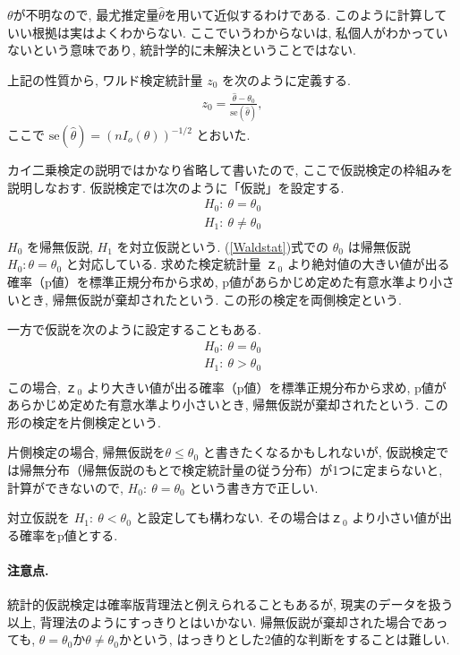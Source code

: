 \documentclass[a4paper, 12pt]{jarticle}
\begin{document}
$\theta$が不明なので, 最尤推定量$\hat \theta$を用いて近似するわけである. このように計算していい根拠は実はよくわからない. ここでいうわからないは, 私個人がわかっていないという意味であり, 統計学的に未解決ということではない. 
 
上記の性質から, ワルド検定統計量 $z_0$ を次のように定義する. 
\begin{align}
z_0=\frac{\hat \theta-\theta_0}{\mathrm{se}(\hat \theta)},
\label{Waldstat}
\end{align}
ここで $\mathrm{se}(\hat \theta) = (nI_o(\theta))^{-1/2}$ とおいた. 

カイ二乗検定の説明ではかなり省略して書いたので, ここで仮説検定の枠組みを説明しなおす.
仮説検定では次のように「仮説」を設定する. 
\begin{align}
H_0:~\theta = \theta_0\\
H_1:~\theta \neq \theta_0\\
 \end{align}
 $H_0$ を帰無仮説, $H_1$ を対立仮説という.
(\ref{Waldstat})式での $\theta_0$ は帰無仮説 $H_0: \theta = \theta_0$ と対応している.
求めた検定統計量 $ｚ_0$ より絶対値の大きい値が出る確率（p値）を標準正規分布から求め, p値があらかじめ定めた有意水準より小さいとき, 帰無仮説が棄却されたという.
この形の検定を両側検定という. 

一方で仮説を次のように設定することもある. 
\begin{align}
H_0:~\theta = \theta_0\\
H_1:~\theta > \theta_0\\
 \end{align}
 この場合, $ｚ_0$ より大きい値が出る確率（p値）を標準正規分布から求め, p値があらかじめ定めた有意水準より小さいとき, 帰無仮説が棄却されたという.
この形の検定を片側検定という. 

片側検定の場合, 帰無仮説を$\theta \le \theta_0$ と書きたくなるかもしれないが, 仮説検定では帰無分布（帰無仮説のもとで検定統計量の従う分布）が1つに定まらないと, 計算ができないので, $H_0:~\theta = \theta_0$ という書き方で正しい.

対立仮説を $H_1:~\theta < \theta_0$ と設定しても構わない. その場合は$ｚ_0$ より小さい値が出る確率をp値とする.

\paragraph{注意点.} 
統計的仮説検定は確率版背理法と例えられることもあるが, 現実のデータを扱う以上, 背理法のようにすっきりとはいかない. 
帰無仮説が棄却された場合であっても, $\theta = \theta_0$か$\theta \neq \theta_0$かという, はっきりとした2値的な判断をすることは難しい. 
\end{document}
